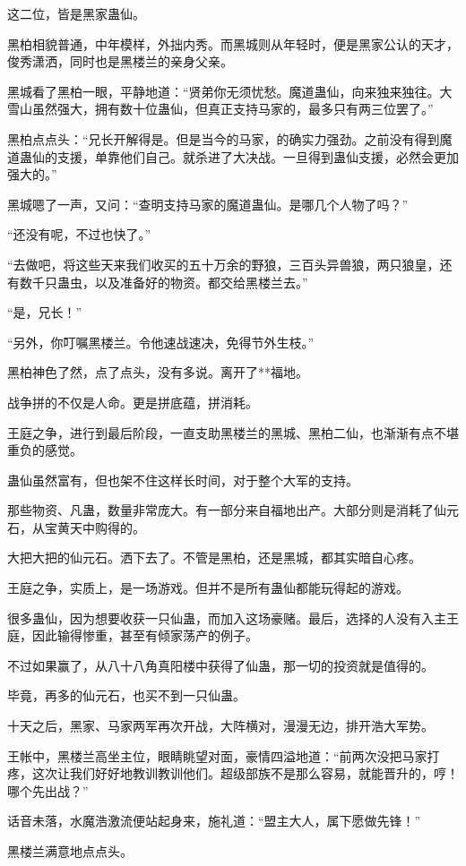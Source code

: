 \begin{this_body}
这二位，皆是黑家蛊仙。

黑柏相貌普通，中年模样，外拙内秀。而黑城则从年轻时，便是黑家公认的天才，俊秀潇洒，同时也是黑楼兰的亲身父亲。

黑城看了黑柏一眼，平静地道：“贤弟你无须忧愁。魔道蛊仙，向来独来独往。大雪山虽然强大，拥有数十位蛊仙，但真正支持马家的，最多只有两三位罢了。”

黑柏点点头：“兄长开解得是。但是当今的马家，的确实力强劲。之前没有得到魔道蛊仙的支援，单靠他们自己。就杀进了大决战。一旦得到蛊仙支援，必然会更加强大的。”

黑城嗯了一声，又问：“查明支持马家的魔道蛊仙。是哪几个人物了吗？”

“还没有呢，不过也快了。”

“去做吧，将这些天来我们收买的五十万余的野狼，三百头异兽狼，两只狼皇，还有数千只蛊虫，以及准备好的物资。都交给黑楼兰去。”

“是，兄长！”

“另外，你叮嘱黑楼兰。令他速战速决，免得节外生枝。”

黑柏神色了然，点了点头，没有多说。离开了**福地。

战争拼的不仅是人命。更是拼底蕴，拼消耗。

王庭之争，进行到最后阶段，一直支助黑楼兰的黑城、黑柏二仙，也渐渐有点不堪重负的感觉。

蛊仙虽然富有，但也架不住这样长时间，对于整个大军的支持。

那些物资、凡蛊，数量非常庞大。有一部分来自福地出产。大部分则是消耗了仙元石，从宝黄天中购得的。

大把大把的仙元石。洒下去了。不管是黑柏，还是黑城，都其实暗自心疼。

王庭之争，实质上，是一场游戏。但并不是所有蛊仙都能玩得起的游戏。

很多蛊仙，因为想要收获一只仙蛊，而加入这场豪赌。最后，选择的人没有入主王庭，因此输得惨重，甚至有倾家荡产的例子。

不过如果赢了，从八十八角真阳楼中获得了仙蛊，那一切的投资就是值得的。

毕竟，再多的仙元石，也买不到一只仙蛊。

十天之后，黑家、马家两军再次开战，大阵横对，漫漫无边，排开浩大军势。

王帐中，黑楼兰高坐主位，眼睛眺望对面，豪情四溢地道：“前两次没把马家打疼，这次让我们好好地教训教训他们。超级部族不是那么容易，就能晋升的，哼！哪个先出战？”

话音未落，水魔浩激流便站起身来，施礼道：“盟主大人，属下愿做先锋！”

黑楼兰满意地点点头。


\end{this_body}
